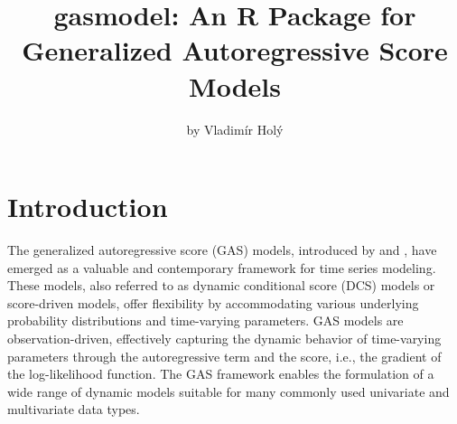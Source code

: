 \title{gasmodel: An R Package for Generalized Autoregressive Score Models}


\author{by Vladimír Holý}

\maketitle


\section{Introduction}\label{introduction}

The generalized autoregressive score (GAS) models, introduced by \citet{Creal2013} and \citet{Harvey2013}, have emerged as a valuable and contemporary framework for time series modeling. These models, also referred to as dynamic conditional score (DCS) models or score-driven models, offer flexibility by accommodating various underlying probability distributions and time-varying parameters. GAS models are observation-driven, effectively capturing the dynamic behavior of time-varying parameters through the autoregressive term and the score, i.e., the gradient of the log-likelihood function. The GAS framework enables the formulation of a wide range of dynamic models suitable for many commonly used univariate and multivariate data types.

